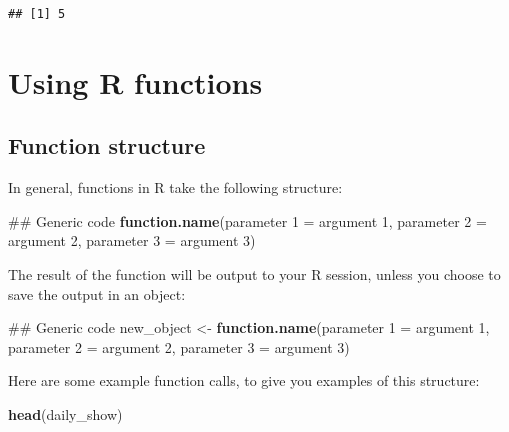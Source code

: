 \documentclass[]{book}
\makeatletter
\newenvironment{Shaded}{\begin{snugshade}}{\end{snugshade}}
\newcommand{\KeywordTok}[1]{\textcolor[rgb]{0.13,0.29,0.53}{\textbf{#1}}}
\newcommand{\DecValTok}[1]{\textcolor[rgb]{0.00,0.00,0.81}{#1}}
\newcommand{\StringTok}[1]{\textcolor[rgb]{0.31,0.60,0.02}{#1}}
\newcommand{\NormalTok}[1]{#1}
\newenvironment{kframe}{%
\medskip{}
\setlength{\fboxsep}{.8em}
 \def\at@end@of@kframe{}%
 \ifinner\ifhmode%
  \def\at@end@of@kframe{\end{minipage}}%
  \begin{minipage}{\columnwidth}%
 \fi\fi%
 \def\FrameCommand##1{\hskip\@totalleftmargin \hskip-\fboxsep
 \colorbox{shadecolor}{##1}\hskip-\fboxsep
     \hskip-\linewidth \hskip-\@totalleftmargin \hskip\columnwidth}%
 \MakeFramed {\advance\hsize-\width
   \@totalleftmargin\z@ \linewidth\hsize
   \@setminipage}}%
 {\par\unskip\endMakeFramed%
 \at@end@of@kframe}
\renewenvironment{Shaded}{\begin{kframe}}{\end{kframe}}
\theoremstyle{definition}
\theoremstyle{definition}
\theoremstyle{definition}
\theoremstyle{remark}
\makeatother
\begin{document}
\begin{verbatim}
## [1] 5
\end{verbatim}

\section{Using R functions}\label{using-r-functions}

\subsection{Function structure}\label{function-structure}

In general, functions in R take the following structure:

\begin{Shaded}
\begin{Highlighting}[]
\NormalTok{## Generic code}
\KeywordTok{function.name}\NormalTok{(parameter }\DecValTok{1}\NormalTok{ =}\StringTok{ }\NormalTok{argument }\DecValTok{1}\NormalTok{, parameter }\DecValTok{2}\NormalTok{ =}\StringTok{ }\NormalTok{argument }\DecValTok{2}\NormalTok{,}
\NormalTok{              parameter }\DecValTok{3}\NormalTok{ =}\StringTok{ }\NormalTok{argument }\DecValTok{3}\NormalTok{)  }
\end{Highlighting}
\end{Shaded}

The result of the function will be output to your R session, unless you
choose to save the output in an object:

\begin{Shaded}
\begin{Highlighting}[]
\NormalTok{## Generic code}
\NormalTok{new_object <-}\StringTok{ }\KeywordTok{function.name}\NormalTok{(parameter }\DecValTok{1}\NormalTok{ =}\StringTok{ }\NormalTok{argument }\DecValTok{1}\NormalTok{,}
\NormalTok{                            parameter }\DecValTok{2}\NormalTok{ =}\StringTok{ }\NormalTok{argument }\DecValTok{2}\NormalTok{,}
\NormalTok{                            parameter }\DecValTok{3}\NormalTok{ =}\StringTok{ }\NormalTok{argument }\DecValTok{3}\NormalTok{)  }
\end{Highlighting}
\end{Shaded}

Here are some example function calls, to give you examples of this
structure:

\begin{Shaded}
\begin{Highlighting}[]
\KeywordTok{head}\NormalTok{(daily_show)}
\end{Highlighting}
\end{Shaded}
\end{document}
